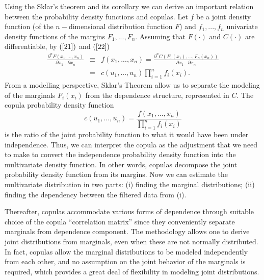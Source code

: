 \documentclass[a4paper,12pt]{report}
\begin{document}
\begin{refsection}
Using the Sklar's theorem and its corollary we can derive an important
relation between the probability density functions and copulas. Let $f$ be a
joint density function (of the $n-$dimensional distribution function $F$)
and $f_{1},...,f_{n}$ univariate density functions of the margins $%
F_{1},...,F_{n}$. Assuming that $F\left( \cdot \right) $ and $C\left( \cdot
\right) $ are differentiable, by $\left( \ref{21}\right) $ and $\left( \ref%
{22}\right) $
\begin{eqnarray}
\frac{\partial ^{n}F\left( x_{1},...,x_{n}\right) }{\partial
	x_{1}...\partial x_{n}} &\equiv &f\left( x_{1},...,x_{n}\right) =\frac{
	\partial ^{n}C\left( F_{1}\left( x_{1}\right) ,...,F_{n}\left( x_{n}\right)
	\right) }{\partial x_{1}...\partial x_{n}} \\
&=&c\left( u_{1},...,u_{n}\right) \prod_{i=1}^{n}f_{i}\left( x_{i}\right) .
\label{23}
\end{eqnarray}%
From a modelling perspective, Sklar's Theorem allow us to separate the
modeling of the marginals $F_{i}\left( x_{i}\right) $ from the dependence
structure, represented in $C$. The copula probability density function
\begin{equation}
c\left( u_{1},...,u_{n}\right) =\frac{f\left( x_{1},...,x_{n}\right) }{
	\prod_{i=1}^{n}f_{i}\left( x_{i}\right) }  \label{24}
\end{equation}%
is the ratio of the joint probability function to what it would have been
under independence. Thus, we can interpret the copula as the adjustment that
we need to make to convert the independence probability density function
into the multivariate density function. In other words, copulas decompose
the joint probability density function from its margins. Now we can estimate
the multivariate distribution in two parts: (i) finding the marginal
distributions; (ii) finding the dependency between the filtered data from
(i). 

Thereafter, copulas accommodate various forms of dependence through suitable choice of the copula ``correlation matrix'' since they conveniently separate marginals from dependence component. The methodology allows one to derive joint distributions from marginals, even when these are not normally distributed. In fact, copulas allow the marginal distributions to be modeled independently from each other, and no assumption on the joint behavior of the marginals is required, which provides a great deal of flexibility in modeling joint distributions.

\bigskip


\end{refsection}
\end{document}
